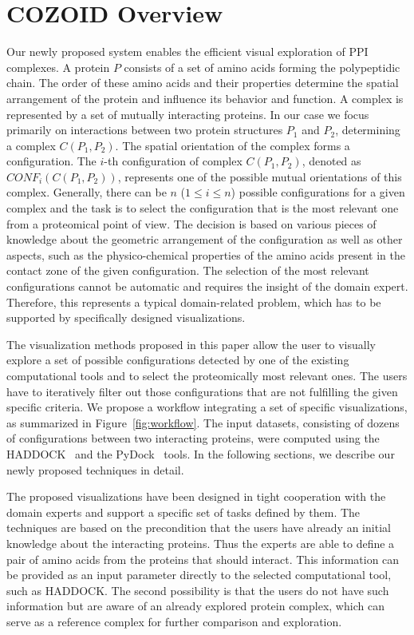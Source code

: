 \documentclass{bmcart}
\begin{document}
\section{COZOID Overview}
Our newly proposed system enables the efficient visual exploration of PPI complexes.
A protein $P$ consists of a set of amino acids forming the polypeptidic chain.
The order of these amino acids and their properties determine the spatial arrangement of the protein and influence its behavior and function.
A complex is represented by a set of mutually interacting proteins.
In our case we focus primarily on interactions between two protein structures $P_1$ and $P_2$, determining a complex $C(P_1,P_2)$.
The spatial orientation of the complex forms a configuration.
The $i$-th configuration of complex $C(P_1,P_2)$, denoted as $CONF_i(C(P_1,P_2))$, represents one of the possible mutual orientations of this complex.
Generally, there can be $n$ ($1 \leq i \leq n$) possible configurations for a given complex and the task is to select the configuration that is the most relevant one from a proteomical point of view.
The decision is based on various pieces of knowledge about the geometric arrangement of the configuration as well as other aspects, such as the physico-chemical properties of the amino acids present in the contact zone of the given configuration.
The selection of the most relevant configurations cannot be automatic and requires the insight of the domain expert.
Therefore, this represents a typical domain-related problem, which has to be supported by specifically designed visualizations.

The visualization methods proposed in this paper allow the user to visually explore a set of possible configurations detected by one of the existing computational tools and to select the proteomically most relevant ones.
The users have to iteratively filter out those configurations that are not fulfilling the given specific criteria.
We propose a workflow integrating a set of specific visualizations, as summarized in Figure~\ref{fig:workflow}.
The input datasets, consisting of dozens of configurations between two interacting proteins, were computed using the HADDOCK~\cite{haddock} and the PyDock~\cite{pydock} tools.
In the following sections, we describe our newly proposed techniques in detail.

The proposed visualizations have been designed in tight cooperation with the domain experts and support a specific set of tasks defined by them.
The techniques are based on the precondition that the users have already an initial knowledge about the interacting proteins.
Thus the experts are able to define a pair of amino acids from the proteins that should interact.
This information can be provided as an input parameter directly to the selected computational tool, such as HADDOCK.
The second possibility is that the users do not have such information but are aware of an already explored protein complex, which can serve as a reference complex for further comparison and exploration.
\end{document}
